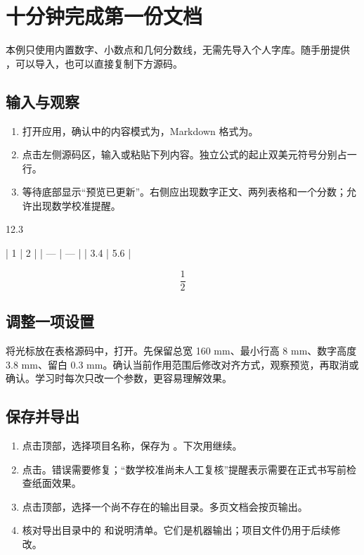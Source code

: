 \chapter{十分钟完成第一份文档}\label{ch:quick}
本例只使用内置数字、小数点和几何分数线，无需先导入个人字库。随手册提供 ，可以导入，也可以直接复制下方源码。

\section{输入与观察}
\begin{enumerate}
\item 打开应用，确认中的内容模式为，Markdown 格式为。
\item 点击左侧源码区，输入或粘贴下列内容。独立公式的起止双美元符号分别占一行。
\item 等待底部显示“预览已更新”。右侧应出现数字正文、两列表格和一个分数；允许出现数学校准提醒。
\end{enumerate}
\par\noindent\begin{minipage}{\linewidth}
\begin{Source}
12.3

| 1 | 2 |
| --- | --- |
| 3.4 | 5.6 |

$$
\frac{1}{2}
$$
\end{Source}
\end{minipage}\par\medskip
{}

\section{调整一项设置}
将光标放在表格源码中，打开。先保留总宽 160 mm、最小行高 8 mm、数字高度 3.8 mm、留白 0.3 mm。确认当前作用范围后修改对齐方式，观察预览，再取消或确认。学习时每次只改一个参数，更容易理解效果。

\section{保存并导出}
\begin{enumerate}
\item 点击顶部，选择项目名称，保存为 。下次用继续。
\item 点击。错误需要修复；“数学校准尚未人工复核”提醒表示需要在正式书写前检查纸面效果。
\item 点击顶部，选择一个尚不存在的输出目录。多页文档会按页输出。
\item 核对导出目录中的  和说明清单。它们是机器输出；项目文件仍用于后续修改。
\end{enumerate}


